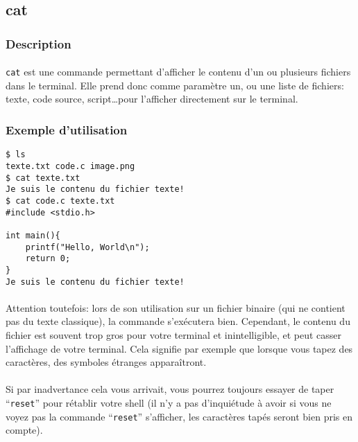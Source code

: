 \subsection{cat}
\subsubsection*{Description}

\paragraph{} \texttt{cat} est une commande permettant d'afficher le contenu d'un
ou plusieurs fichiers dans le terminal. Elle prend donc comme paramètre un, ou
une liste de fichiers: texte, code source, script\ldots pour l'afficher
directement sur le terminal.

\subsubsection*{Exemple d'utilisation}

\begin{lstlisting}
$ ls
texte.txt code.c image.png
$ cat texte.txt
Je suis le contenu du fichier texte!
$ cat code.c texte.txt
#include <stdio.h>

int main(){
	printf("Hello, World\n");
	return 0;
}
Je suis le contenu du fichier texte!
\end{lstlisting}

\paragraph{} Attention toutefois: lors de son utilisation sur un fichier
binaire (qui ne contient pas du texte classique), la commande s'exécutera bien.
Cependant, le contenu du fichier est souvent trop gros pour votre terminal et
inintelligible, et peut casser l'affichage de votre terminal. Cela signifie par
exemple que lorsque vous tapez des caractères, des symboles étranges
apparaîtront.

\paragraph{} Si par inadvertance cela vous arrivait, vous pourrez toujours
essayer de taper ``\texttt{reset}'' pour rétablir votre shell (il n'y a pas
d'inquiétude à avoir si vous ne voyez pas la commande ``\texttt{reset}''
s'afficher, les caractères tapés seront bien pris en compte).
